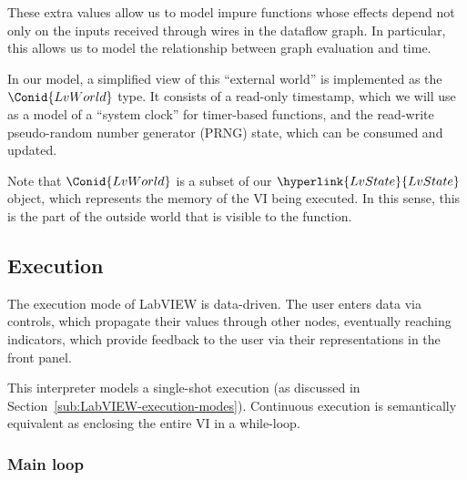 These extra values allow us to model impure functions whose effects depend not
only on the inputs received through wires in the dataflow graph. In
particular, this allows us to model the relationship between graph evaluation
and time.

In our model, a simplified view of this ``external world'' is implemented as
the \ensuremath{\Conid{LvWorld}} type. It consists of a read-only timestamp, which we will use as
a model of a ``system clock'' for timer-based functions, and the read-write
pseudo-random number generator (PRNG) state, which can be consumed and
updated.

\resethooks

Note that \ensuremath{\Conid{LvWorld}} is a subset of our \ensuremath{\hyperlink{LvState}{LvState}} object, which represents the
memory of the VI being executed. In this sense, this is the part of the
outside world that is visible to the function.

\subsection{Execution}

The execution mode of LabVIEW is data-driven. The user enters data via
controls, which propagate their values through other nodes, eventually
reaching indicators, which provide feedback to the user via their
representations in the front panel.

This interpreter models a single-shot execution (as discussed in
Section~\ref{sub:LabVIEW-execution-modes}). Continuous execution is
semantically equivalent as enclosing the entire VI in a while-loop.

\subsubsection{Main loop}

